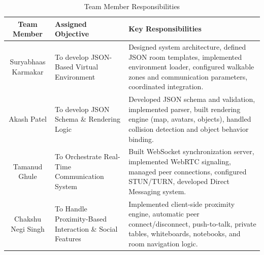 \documentclass[10pt,a4paper]{article}
\begin{document}
\begin{table}[h]
\centering
\renewcommand{\arraystretch}{1.3}
\begin{tabular}{|c|p{4cm}|p{8cm}|}
\hline
\textbf{Team Member} & \textbf{Assigned Objective} & \textbf{Key Responsibilities} \\
\hline
Suryabhaas Karmakar & To develop JSON-Based Virtual Environment & 
Designed system architecture, defined JSON room templates, implemented environment loader, configured walkable zones and communication parameters, coordinated integration. \\
\hline
Akash Patel & To develop JSON Schema \& Rendering Logic & 
Developed JSON schema and validation, implemented parser, built rendering engine (map, avatars, objects), handled collision detection and object behavior binding. \\
\hline
Tamanud Ghule & To Orchestrate Real-Time Communication System & 
Built WebSocket synchronization server, implemented WebRTC signaling, managed peer connections, configured STUN/TURN, developed Direct Messaging system. \\
\hline
Chakshu Negi Singh & To Handle Proximity-Based Interaction \& Social Features & 
Implemented client-side proximity engine, automatic peer connect/disconnect, push-to-talk, private tables, whiteboards, notebooks, and room navigation logic. \\
\hline
\end{tabular}
\caption{Team Member Responsibilities}
\label{tab:team_responsibilities}
\end{table}
\end{document}
